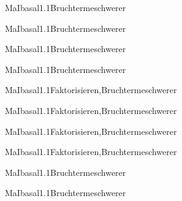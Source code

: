 \documentclass[12pt]{article}
\begin{document}
    \begin{Add}{MaI}{basal1.1}{Bruchterme}{schwerer}
    \solution{ }
    \end{Add}
    \begin{Add}{MaI}{basal1.1}{Bruchterme}{schwerer}
    \end{Add}
    

    \begin{Add}{MaI}{basal1.1}{Bruchterme}{schwerer}
    \solution{ }
    \end{Add}
    \begin{Add}{MaI}{basal1.1}{Bruchterme}{schwerer}
    \end{Add}
    

   \begin{Add}{MaI}{basal1.1}{Faktorisieren,Bruchterme}{schwerer}
   \solution{ }
   \end{Add}
   \begin{Add}{MaI}{basal1.1}{Faktorisieren,Bruchterme}{schwerer}
   \end{Add}
   

   \begin{Add}{MaI}{basal1.1}{Faktorisieren,Bruchterme}{schwerer}
   \solution{ }
   \end{Add}
   \begin{Add}{MaI}{basal1.1}{Faktorisieren,Bruchterme}{schwerer}
   \end{Add}
   

   \begin{Add}{MaI}{basal1.1}{Bruchterme}{schwerer}
   \solution{ }
   \end{Add}
   \begin{Add}{MaI}{basal1.1}{Bruchterme}{schwerer}
   \end{Add}
   
\end{document}
